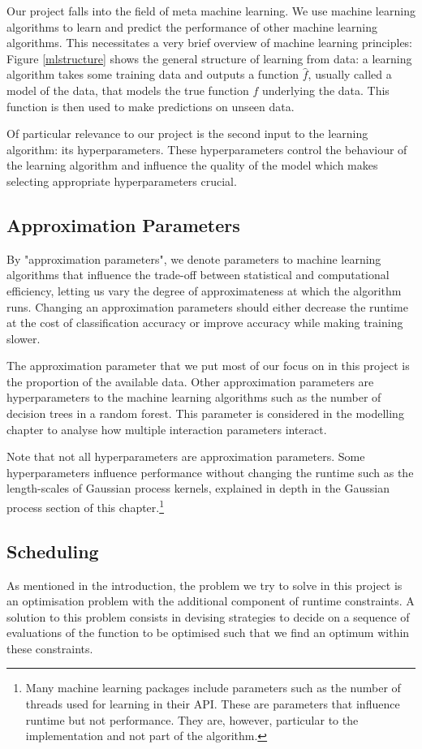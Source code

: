 \documentclass[a4paper,12pt,twoside,openright]{report}
\begin{document}
Our project falls into the field of meta machine learning. We use machine learning algorithms to learn and predict the performance of other machine learning algorithms. This necessitates a very brief overview of machine learning principles: Figure \ref{mlstructure} shows the general structure of learning from data: a learning algorithm takes some training data and outputs a function $\hat{f}$, usually called a model of the data, that models the true function $f$ underlying the data. This function is then used to make predictions on unseen data.

Of particular relevance to our project is the second input to the learning algorithm: its hyperparameters. These hyperparameters control the behaviour of the learning algorithm and influence the quality of the model which makes selecting appropriate hyperparameters crucial.


\subsection{Approximation Parameters}
By "approximation parameters", we denote parameters to machine learning algorithms that influence the trade-off between statistical and computational efficiency, letting us vary the degree of approximateness at which the algorithm runs. Changing an approximation parameters should either decrease the runtime at the cost of classification accuracy or improve accuracy while making training slower. 

The approximation parameter that we put most of our focus on in this project is the proportion of the available data. Other approximation parameters are hyperparameters to the machine learning algorithms such as the number of decision trees in a random forest. This parameter is considered in the modelling chapter to analyse how multiple interaction parameters interact.

Note that not all hyperparameters are approximation parameters. Some hyperparameters influence performance without changing the runtime such as the length-scales of Gaussian process kernels, explained in depth in the Gaussian process section of this chapter.\footnote{Many machine learning packages include parameters such as the number of threads used for learning in their API. These are parameters that influence runtime but not performance. They are, however, particular to the implementation and not part of the algorithm.}

\subsection{Scheduling}
As mentioned in the introduction, the problem we try to solve in this project is an optimisation problem with the additional component of runtime constraints. A solution to this problem consists in devising strategies to decide on a sequence of evaluations of the function to be optimised such that we find an optimum within these constraints. 
\end{document}
